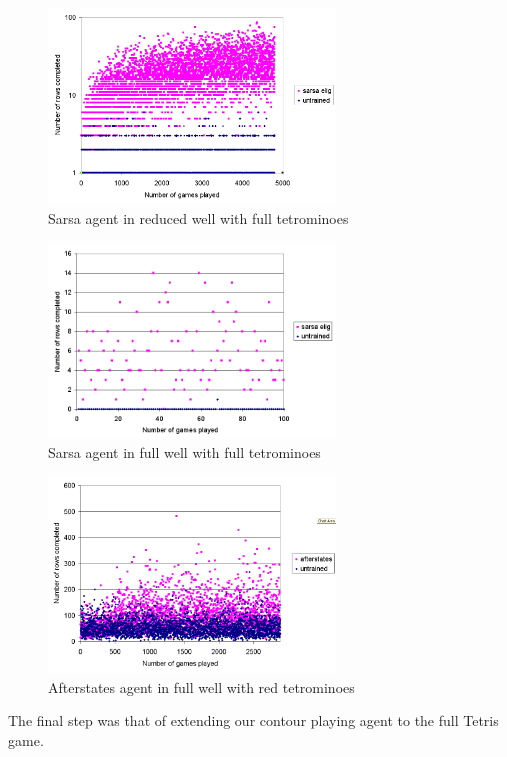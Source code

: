 \documentclass{rucsthesis}
\begin{document}
\begin{figure}[h]
\centering
\includegraphics[width=3in]{sarsaeligfulltetredwell.png}
\caption{Sarsa agent in reduced well with full tetrominoes}
\label{fig:comparemelax}
\end{figure}

\begin{figure}[h]
\centering
\includegraphics[width=3in]{sarsaeligfulltetfullwell.png}
\caption{Sarsa agent in full well with full tetrominoes}
\label{fig:comparemelax}
\end{figure}

\begin{figure}[h]
\centering
\includegraphics[width=3in]{Afterstatesheightredtetfullwell.png}
\caption{Afterstates agent in full well with red tetrominoes}
\label{fig:comparemelax}
\end{figure}

The final step was that of extending our contour playing agent to the full Tetris game.
\end{document}
